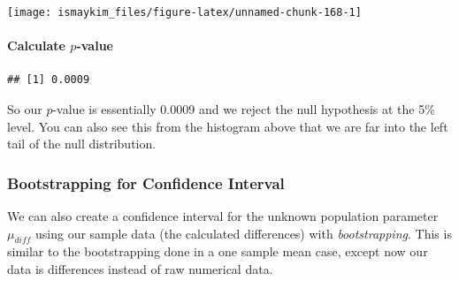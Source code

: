 \documentclass[]{tufte-book}
\newenvironment{Shaded}{\begin{snugshade}}{\end{snugshade}}
\newcommand{\KeywordTok}[1]{\textcolor[rgb]{0.13,0.29,0.53}{\textbf{{#1}}}}
\newcommand{\DataTypeTok}[1]{\textcolor[rgb]{0.13,0.29,0.53}{{#1}}}
\newcommand{\DecValTok}[1]{\textcolor[rgb]{0.00,0.00,0.81}{{#1}}}
\newcommand{\StringTok}[1]{\textcolor[rgb]{0.31,0.60,0.02}{{#1}}}
\newcommand{\OtherTok}[1]{\textcolor[rgb]{0.56,0.35,0.01}{{#1}}}
\newcommand{\NormalTok}[1]{{#1}}
\theoremstyle{definition}
\theoremstyle{definition}
\theoremstyle{remark}
\begin{document}
\begin{center}\texttt{[image: ismaykim\_files/figure-latex/unnamed-chunk-168-1]} \end{center}

\paragraph{\texorpdfstring{Calculate
\(p\)-value}{Calculate p-value}}\label{calculate-p-value-4}

\begin{Shaded}
\end{Shaded}

\begin{verbatim}
## [1] 0.0009
\end{verbatim}

So our \(p\)-value is essentially 0.0009 and we reject the null
hypothesis at the 5\% level. You can also see this from the histogram
above that we are far into the left tail of the null distribution.

\subsubsection{Bootstrapping for Confidence
Interval}\label{bootstrapping-for-confidence-interval-4}

We can also create a confidence interval for the unknown population
parameter \(\mu_{diff}\) using our sample data (the calculated
differences) with \emph{bootstrapping}. This is similar to the
bootstrapping done in a one sample mean case, except now our data is
differences instead of raw numerical data.

\begin{Shaded}
\end{Shaded}
\end{document}
